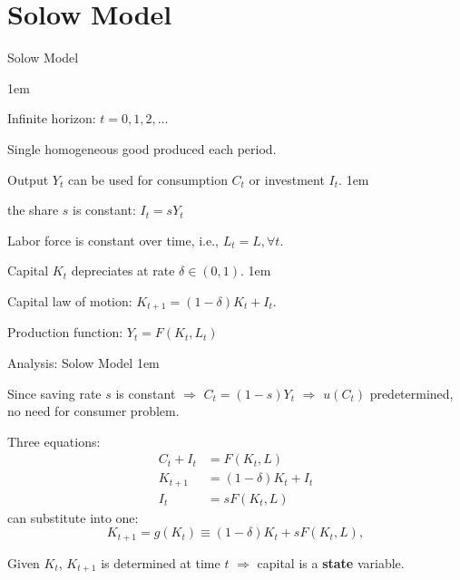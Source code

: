 \documentclass[11pt,aspectratio=43,usenames,dvipsnames]{beamer}
\let\olditemize=\itemize
\let\endolditemize=\enditemize
\renewenvironment{itemize}{\olditemize \itemsep1em}{\endolditemize}
\theoremstyle{definition}
\begin{document}
\section{Solow Model}
\label{sec:Solow_Model}


\begin{frame}{Solow Model}
\label{slide:Solow_Model}

\begin{itemize}
    \item Infinite horizon: $ t = 0, 1, 2, \ldots$
    \item Single homogeneous good produced each period.
    \item Output $ Y_{t} $ can be used for consumption $ C_{t} $ or investment $ I_{t} $.
    \begin{itemize}
        \item the share $ s $ is constant: $ I_{t} = s Y_{t} $
    \end{itemize}
    \item Labor force is constant over time, i.e., $ L_{t} = L, \forall t$.
    \item Capital $ K_{t} $ depreciates at rate $ \delta \in (0, 1) $.
    \begin{itemize}
        \item Capital law of motion: $ K_{t+1} = (1-\delta)K_{t} + I_{t} $.
    \end{itemize}
    \item Production function: $ Y_{t} = F(K_{t}, L_{t}) $
\end{itemize}

\end{frame}

\begin{frame}{Analysis: Solow Model}
\label{slide:Analysis__Solow_Model}
    \begin{itemize}
        \item Since saving rate $ s $ is constant $ \Rightarrow  $ $ C_{t} = (1-s)Y_{t} $ $ \Rightarrow  $ $ u(C_{t}) $ predetermined, no need for consumer problem.
        \item Three equations:
        \begin{align}
            C_{t} + I_{t}
                & = F(K_{t}, L)
            \\
            K_{t+1}
                & = (1-\delta)K_{t} + I_{t}
            \\
            I_{t}
                & = s F(K_{t}, L)
        \end{align}
        can substitute into one:
        \begin{equation}
        \label{eq:Capital_decision}
            K_{t+1} = g(K_{t}) \equiv (1-\delta)K_{t} + s F(K_{t}, L)
        ,\end{equation}
        \item Given $ K_{t} $, $ K_{t+1} $ is determined at time $ t $ $ \Rightarrow $ capital is a \textbf{state} variable.
    \end{itemize}
\end{frame}
\end{document}
